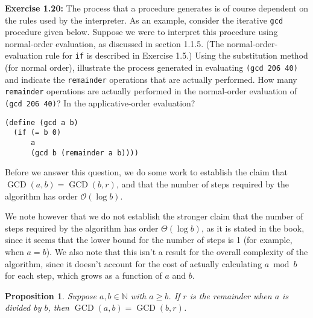 \documentclass{article}
\newtheorem{proposition}{Proposition}
\DeclareMathOperator{\GCD}{GCD}
\begin{document}

\noindent \textbf{Exercise 1.20:} The process that a procedure generates is of
course dependent on the rules used by the interpreter.  As an example, consider
the iterative \lstinline{gcd} procedure given below.  Suppose we were to
interpret this procedure using normal-order evaluation, as discussed in section
1.1.5.  (The normal-order-evaluation rule for \lstinline{if} is described in
Exercise 1.5.)  Using the substitution method (for normal order), illustrate the
process generated in evaluating \lstinline{(gcd 206 40)} and indicate the
\lstinline{remainder} operations that are actually performed.  How many
\lstinline{remainder} operations are actually performed in the normal-order
evaluation of \lstinline{(gcd 206 40)}?  In the applicative-order evaluation?
\vspace{3mm}
\begin{lstlisting}[style=scheme]
(define (gcd a b)
  (if (= b 0)
      a
      (gcd b (remainder a b))))
\end{lstlisting}
\vspace{10mm}





Before we answer this question, we do some work to establish the claim that
$\GCD(a,b) = \GCD(b,r)$, and that the number of steps required by the algorithm
has order $\mathcal{O}(\log b)$.

We note however that we do not establish the stronger claim that the number of
steps required by the algorithm has order $\Theta(\log b)$, as it is stated in
the book, since it seems that the lower bound for the number of steps is 1 (for
example, when $a = b$).  We also note that this isn't a result for the overall
complexity of the algorithm, since it doesn't account for the cost of actually
calculating $a \bmod b$ for each step, which grows as a function of $a$ and $b$.

\vspace{5mm}





\begin{proposition}
  Suppose $a, b \in \mathbb{N}$ with $a \geq b$.  If $r$ is the remainder when
  $a$ is divided by $b$, then $\GCD(a,b) = \GCD(b,r)$.
\end{proposition}
\end{document}
